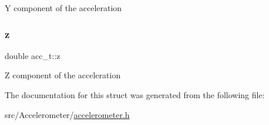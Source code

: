 Y component of the acceleration \mbox{\label{structacc__t_af3dcc0d57b5d2027c802f66c4fe28734}} 
\subsubsection{\texorpdfstring{z}{z}}
{\footnotesize\ttfamily double acc\+\_\+t\+::z}

Z component of the acceleration 

The documentation for this struct was generated from the following file\+:\begin{DoxyCompactItemize}
\item 
src/\+Accelerometer/\hyperlink{accelerometer_8h}{accelerometer.\+h}\end{DoxyCompactItemize}
